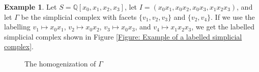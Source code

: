 \documentclass[12pt,leqno]{amsart}
\theoremstyle{definition}
\newtheorem{example}[lemma]{Example}
\begin{document}
\begin{example}
  \label{Example: First example of a homogenized chain complex}
  Let $S = \mathbb Q[x_0,x_1,x_2,x_3]$, let
  $I = (x_0x_1,x_0x_2,x_0x_3,x_1x_2x_3)$, and let $\Gamma$ be the simplicial
  complex with facets $\{ v_1,v_2,v_3 \}$ and $\{ v_2, v_4 \}$.
  If we use the labelling $v_1 \longmapsto x_0x_1$, $v_2 \longmapsto x_0x_2$,
  $v_3 \longmapsto x_0x_3$, and $v_4 \longmapsto x_1x_2x_3$, we get the
  labelled simplicial complex shown in Figure \ref{Figure: Example of a
    labelled simplicial complex}.
  \begin{figure}[h]\centering
  \caption{The homogenization of $\Gamma$}\label{Figure: Example of a labelled simplicial complex}

\end{figure}
\end{example}
\end{document}
